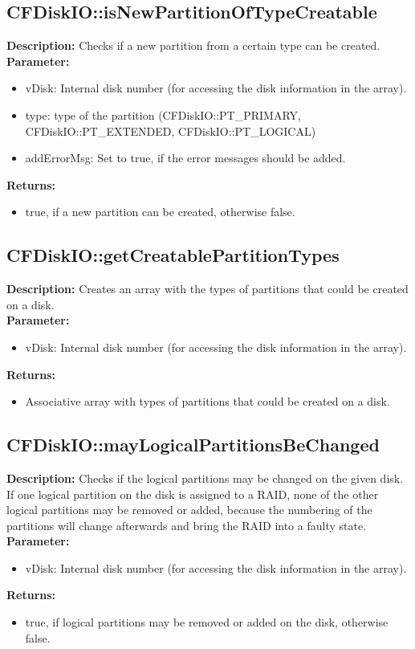 \subsection{CFDiskIO::isNewPartitionOfTypeCreatable}
\textbf{Description:} Checks if a new partition from a certain type can be created.\\
\textbf{Parameter:}
\begin{itemize}
\item vDisk: Internal disk number (for accessing the disk information in the array).
\item type: type of the partition (CFDiskIO::PT\_PRIMARY, CFDiskIO::PT\_EXTENDED, CFDiskIO::PT\_LOGICAL)
\item addErrorMsg: Set to true, if the error messages should be added.
\end{itemize}
\textbf{Returns:}
\begin{itemize}
\item true, if a new partition can be created, otherwise false.
\end{itemize}

\subsection{CFDiskIO::getCreatablePartitionTypes}
\textbf{Description:} Creates an array with the types of partitions that could be created on a disk.\\
\textbf{Parameter:}
\begin{itemize}
\item vDisk: Internal disk number (for accessing the disk information in the array).
\end{itemize}
\textbf{Returns:}
\begin{itemize}
\item Associative array with types of partitions that could be created on a disk.
\end{itemize}

\subsection{CFDiskIO::mayLogicalPartitionsBeChanged}
\textbf{Description:} Checks if the logical partitions may be changed on the given disk. If one logical partition on the disk is assigned to a RAID, none of the other logical partitions may be removed or added, because the numbering of the partitions will change afterwards and bring the RAID into a faulty state.\\
\textbf{Parameter:}
\begin{itemize}
\item vDisk: Internal disk number (for accessing the disk information in the array).
\end{itemize}
\textbf{Returns:}
\begin{itemize}
\item true, if logical partitions may be removed or added on the disk, otherwise false.
\end{itemize}

